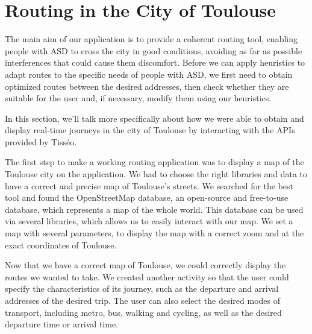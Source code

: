 
\section{Routing in the City of Toulouse}

The main aim of our application is to provide a coherent routing tool, enabling people with ASD to cross the city in good conditions, avoiding as far as possible interferences that could cause them discomfort. Before we can apply heuristics to adapt routes to the specific needs of people with ASD, we first need to obtain optimized routes between the desired addresses, then check whether they are suitable for the user and, if necessary, modify them using our heuristics.\newline

In this section, we'll talk more specifically about how we were able to obtain and display real-time journeys in the city of Toulouse by interacting with the APIs provided by Tisséo.\newline


The first step to make a working routing application was to display a map of the Toulouse city on the application. We had to choose the right libraries and data to have a correct and precise map of Toulouse's streets. We searched for the best tool and found the OpenStreetMap database, an open-source and free-to-use database, which represents a map of the whole world. This database can be used via several libraries, which allows us to easily interact with our map. We set a map with several parameters, to display the map with a correct zoom and at the exact coordinates of Toulouse.\newline


Now that we have a correct map of Toulouse, we could correctly display the routes we wanted to take. We created another activity so that the user could specify the characteristics of its journey, such as the departure and arrival addresses of the desired trip. The user can also select the desired modes of transport, including metro, bus, walking and cycling, as well as the desired departure time or arrival time.\newline

